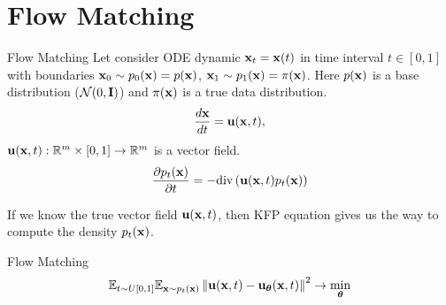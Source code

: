 \section{Flow Matching}
\begin{frame}{Flow Matching}
	Let consider ODE dynamic $\mathbf{x}_t = \mathbf{x}(t)$ in time interval $t \in [0, 1]$ with boundaries $\mathbf{x}_0 \sim p_0(\mathbf{x}) = p(\mathbf{x})$, $\mathbf{x}_1 \sim p_1(\mathbf{x}) =  \pi(\mathbf{x})$. Here $p(\mathbf{x})$ is a base distribution ($\mathcal{N}(0, \mathbf{I})$) and $\pi(\mathbf{x})$ is a true data distribution.
	\[
		\frac{d \mathbf{x}}{dt} = \mathbf{u} (\mathbf{x}, t),
	\]
	$\mathbf{u} (\mathbf{x}, t): \mathbb{R}^m \times [0, 1] \rightarrow \mathbb{R}^m$ is a vector field.
	\[
		\frac{\partial p_t(\mathbf{x})}{\partial t} = - \text{div}\left(\mathbf{u}(\mathbf{x}, t) p_t(\mathbf{x})\right) 
	\]
	
	If we know the true vector field $\mathbf{u} (\mathbf{x}, t)$, then KFP equation gives us the way to compute the density $p_t(\mathbf{x})$.
	\begin{block}{Flow Matching}
		\[
			\mathbb{E}_{t \sim U[0, 1]} \mathbb{E}_{\mathbf{x} \sim p_t(\mathbf{x})}\left\| \mathbf{u}(\mathbf{x}, t) - \mathbf{u}_{\boldsymbol{\theta}}(\mathbf{x}, t) \right\|^2 \rightarrow \min_{\boldsymbol{\theta}}
		\]
	\end{block}
\end{frame}
